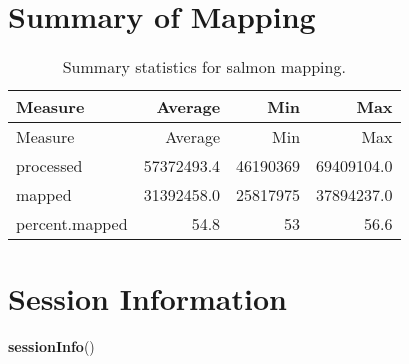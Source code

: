 \documentclass[]{article}
\newenvironment{Shaded}{\begin{snugshade}}{\end{snugshade}}
\newcommand{\DataTypeTok}[1]{\textcolor[rgb]{0.13,0.29,0.53}{#1}}
\newcommand{\KeywordTok}[1]{\textcolor[rgb]{0.13,0.29,0.53}{\textbf{#1}}}
\newcommand{\NormalTok}[1]{#1}
\newcommand{\OperatorTok}[1]{\textcolor[rgb]{0.81,0.36,0.00}{\textbf{#1}}}
\newcommand{\StringTok}[1]{\textcolor[rgb]{0.31,0.60,0.02}{#1}}
\begin{document}
\hypertarget{summary-of-mapping}{%
\section{Summary of Mapping}\label{summary-of-mapping}}

\begin{Shaded}
\end{Shaded}

\begin{longtable}[]{@{}lrrr@{}}
\caption{Summary statistics for salmon mapping.}\tabularnewline
\toprule
Measure & Average & Min & Max\tabularnewline
\midrule
\endfirsthead
\toprule
Measure & Average & Min & Max\tabularnewline
\midrule
\endhead
processed & 57372493.4 & 46190369 & 69409104.0\tabularnewline
mapped & 31392458.0 & 25817975 & 37894237.0\tabularnewline
percent.mapped & 54.8 & 53 & 56.6\tabularnewline
\bottomrule
\end{longtable}

\hypertarget{session-information}{%
\section{Session Information}\label{session-information}}

\begin{Shaded}
\begin{Highlighting}[]
\KeywordTok{sessionInfo}\NormalTok{()}
\end{Highlighting}
\end{Shaded}
\end{document}
